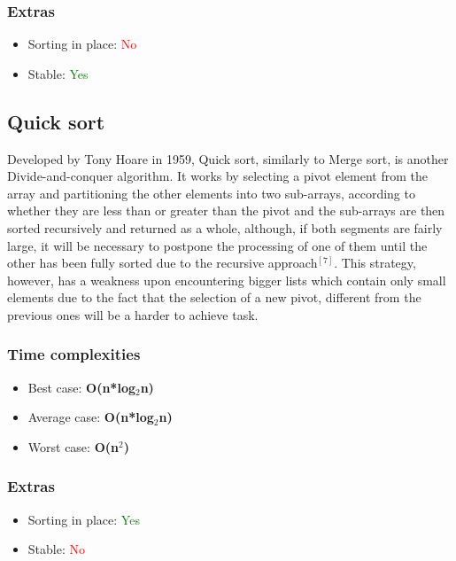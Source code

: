 \documentclass{article}
\begin{document}
\begin{multicols}{2}
\subsubsection{Extras}
\begin{itemize}
    \item Sorting in place: \textcolor{red}{No}
    \item Stable: \textcolor{green}{Yes}
\end{itemize}
\bigbreak \bigbreak \bigbreak \bigbreak \bigbreak \bigbreak \bigbreak \bigbreak \bigbreak

\subsection{Quick sort}
Developed by Tony Hoare in 1959, Quick sort, similarly to Merge sort, is another Divide-and-conquer algorithm. It works by selecting a pivot element from the array and partitioning the other elements into two sub-arrays, according to whether they are less than or greater than the pivot and the sub-arrays are then sorted recursively and returned as a whole, although, if both segments are fairly large, it will be necessary to postpone the processing of one of them until the other has been fully sorted due to the recursive approach$^{[7]}$.  This strategy, however, has a weakness upon encountering bigger lists which contain only small elements due to the fact that the selection of a new pivot, different from the previous ones will be a harder to achieve task.
\subsubsection{Time complexities}
\begin{itemize}
    \item Best case: \textbf{O(n*log$_2$n)}
    \item Average case: \textbf{O(n*log$_2$n)}
    \item Worst case: \textbf{O(n$^2$)}
\end{itemize}

\subsubsection{Extras}
\begin{itemize}
    \item Sorting in place: \textcolor{green}{Yes}
    \item Stable: \textcolor{red}{No}
\end{itemize}


\end{multicols}
\end{document}
